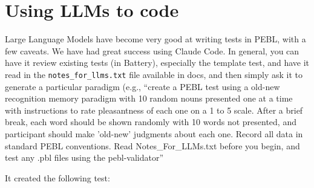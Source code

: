 \section{Using LLMs to code}
Large Language Models have become very good at writing tests in PEBL, with a few caveats. We have had great success using Claude Code. In general, you can have it review existing tests (in Battery), especially the template test, and have it read in the \texttt{notes\_for\_llms.txt} file available in docs, and then simply ask it to generate a particular paradigm (e.g., ``create a PEBL test using a old-new recognition memory paradigm with 10 random nouns presented one at a time with instructions to rate pleasantness of each one on a 1 to 5 scale.  After a brief break, each word should be shown randomly with 10 words not presented, and participant should make 'old-new' judgments about each one. Record all data in standard PEBL conventions. Read Notes\_For\_LLMs.txt before you begin, and test any .pbl files using the pebl-validator'' 


It created  the following test:

